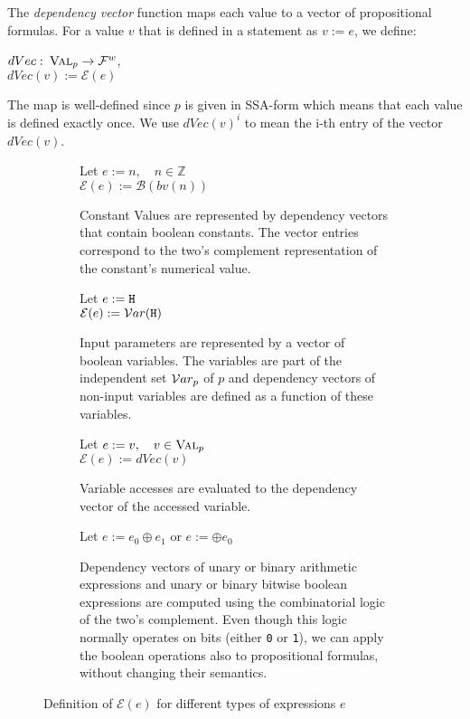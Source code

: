 \begin{definition}
        The \emph{dependency vector} function maps each value to a vector of propositional formulas. For a value $v$ that is defined in a statement as $v := e$, we define:
    \begin{center}
        $dVec: \: \textsc{Val}_p \to \mathcal{F}^w$,\\
        $dVec(v) := \mathcal{E}(e)$
    \end{center}
    The map is well-defined since $p$ is given in SSA-form which means that each value is defined exactly once. We use $dVec(v)^i$ to mean the i-th entry of the vector $dVec(v)$.
    \end{definition}

\begin{figure}
    \begin{subfigure}{1\textwidth}
    \centering
        Let $e := n, \quad n \in \mathbb{Z}$\\
        $\mathcal{E}(e) := \mathcal{B}(bv(n))$
        \caption{Constant Values are represented by dependency vectors that contain boolean constants. The vector entries correspond to the two's complement representation of the constant's numerical value.}
    \end{subfigure}
    \bigskip
    \begin{subfigure}{1\textwidth}
        \centering
        Let $e := \mathtt{H}$\\
        $\mathcal{E}(e) := \mathcal{V}ar(\mathtt{H})$
        \caption{Input parameters are represented by a vector of boolean variables. The variables are part of the independent set $\mathcal{V}ar_p$ of $p$ and dependency vectors of non-input variables are defined as a function of these variables.}
    \end{subfigure}
    \bigskip
    \begin{subfigure}{1\textwidth}
        \centering
        Let $e := v, \quad v \in \textsc{Val}_p$\\
        $\mathcal{E}(e) := dVec(v)$
        \caption{Variable accesses are evaluated to the dependency vector of the accessed variable.}
    \end{subfigure}
    \bigskip
    \begin{subfigure}{1\textwidth}
    \centering
    Let $e := e_0 \oplus e_1$ or $e := \oplus e_0$
       \caption{Dependency vectors of unary or binary arithmetic expressions and unary or binary bitwise boolean expressions are computed using the combinatorial logic of the two's complement. Even though this logic normally operates on bits (either \texttt{0} or \texttt{1}), we can apply the boolean operations also to propositional formulas, without changing their semantics.}
    \end{subfigure}
    \caption{Definition of $\mathcal{E}(e)$ for different types of expressions $e$}\label{fig:expr}
\end{figure}

